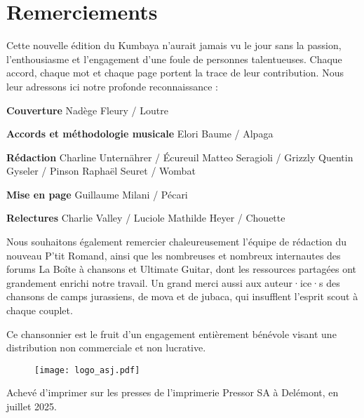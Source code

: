 \section*{Remerciements}
Cette nouvelle édition du Kumbaya n'aurait jamais vu le jour sans la passion, l'enthousiasme et l'engagement d'une foule de personnes talentueuses. Chaque accord, chaque mot et chaque page portent la trace de leur contribution. Nous leur adressons ici notre profonde reconnaissance :

\begin{flushleft}
    \textbf{Couverture} \linebreak
    Nadège Fleury / Loutre

    \textbf{Accords et méthodologie musicale} \linebreak
    Elori Baume / Alpaga

    \textbf{Rédaction} \linebreak
    Charline Unternährer / Écureuil \linebreak
    Matteo Seragioli / Grizzly \linebreak
    Quentin Gyseler / Pinson \linebreak
    Raphaël Seuret / Wombat

    \textbf{Mise en page} \linebreak
    Guillaume Milani / Pécari

    \textbf{Relectures} \linebreak
    Charlie Valley / Luciole\linebreak
    Mathilde Heyer / Chouette
\end{flushleft}

Nous souhaitons également remercier chaleureusement l'équipe de rédaction du nouveau P'tit Romand, ainsi que les nombreuses et nombreux internautes des forums La Boîte à chansons et Ultimate Guitar, dont les ressources partagées ont grandement enrichi notre travail. Un grand merci aussi aux auteur·ice·s des chansons de camps jurassiens, de mova et de jubaca, qui insufflent l'esprit scout à chaque couplet.

Ce chansonnier est le fruit d'un engagement entièrement bénévole visant une distribution non commerciale et non lucrative.

\begin{figure}[h]
    \vspace{4pt}
    \texttt{[image: logo\_asj.pdf]}
    \centering
    \vspace{4pt}
\end{figure}

Achevé d'imprimer sur les presses de l'imprimerie Pressor SA à Delémont, en juillet 2025.
